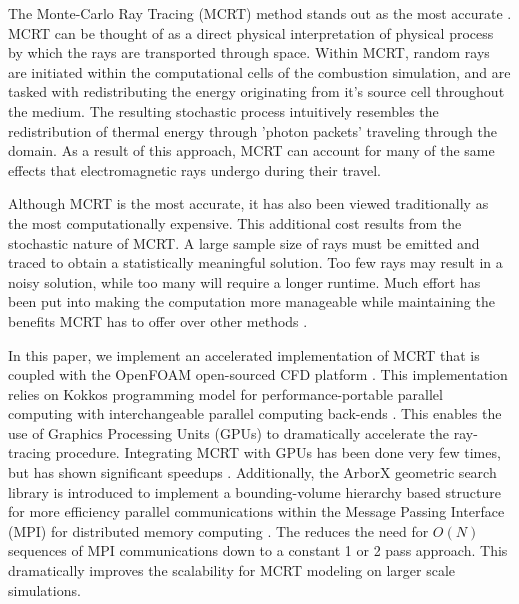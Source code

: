 The Monte-Carlo Ray Tracing (MCRT) method stands out as the most accurate \cite{Tesse2002RadiativeApproach,Modest2013RadiativeTransfer,Coelho2018RadiativeSystems}. 
MCRT can be thought of as a direct physical interpretation of physical process by which the rays are transported through space.
Within MCRT, random rays are initiated within the computational cells of the combustion simulation, and are tasked with redistributing the energy originating from it's source cell throughout the medium. The resulting stochastic process intuitively resembles the redistribution of thermal energy through 'photon packets' traveling through the domain.
As a result of this approach, MCRT can account for many of the same effects that electromagnetic rays undergo during their travel.

Although MCRT is the most accurate, it has also been viewed traditionally as the most computationally expensive.
This additional cost results from the stochastic nature of MCRT. A large sample size of rays must be emitted and traced to obtain a statistically meaningful solution. 
Too few rays may result in a noisy solution, while too many will require a longer runtime.
Much effort has been put into making the computation more manageable while maintaining the benefits MCRT has to offer over other methods \cite{Liu2020TheFlames,Tesse2002RadiativeApproach,Zeeb2001AnGeometries,Modest2003BackwardTransfer,Howell2010ThermalTransfer}.

In this paper, we implement an accelerated implementation of MCRT that is coupled with the OpenFOAM open-sourced CFD platform \cite{Weller1998ATechniques}. 
This implementation relies on Kokkos programming model for performance-portable parallel computing with interchangeable parallel computing back-ends \cite{Trott2021KokkosEra}. This enables the use of Graphics Processing Units (GPUs) to dramatically accelerate the ray-tracing procedure. Integrating MCRT with GPUs has been done very few times, but has shown significant speedups \cite{Silvestri2019ASimulation,Humphrey2016RadiativeRefinement,Heymann2012GPU-basedAGN}. 
Additionally, the ArborX geometric search library is introduced to implement a bounding-volume hierarchy based structure for more efficiency parallel communications within the Message Passing Interface (MPI) for distributed memory computing \cite{Lebrun-Grandie2019ArborX:Library}. 
The  reduces the need for $O(N)$ sequences of MPI communications down to a constant 1 or 2 pass approach. This dramatically improves the scalability for MCRT modeling on larger scale simulations. 

